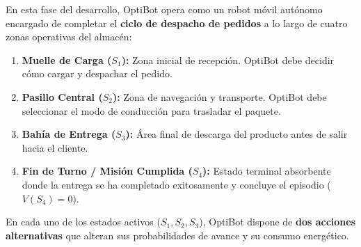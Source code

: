\begin{optibot}
En esta fase del desarrollo, OptiBot opera como un robot móvil autónomo encargado de completar el \textbf{ciclo de despacho de pedidos} a lo largo de cuatro zonas operativas del almacén:
\begin{enumerate}
  \item \textbf{Muelle de Carga ($S_1$):} Zona inicial de recepción. OptiBot debe decidir cómo cargar y despachar el pedido.
  \item \textbf{Pasillo Central ($S_2$):} Zona de navegación y transporte. OptiBot debe seleccionar el modo de conducción para trasladar el paquete.
  \item \textbf{Bahía de Entrega ($S_3$):} Área final de descarga del producto antes de salir hacia el cliente.
  \item \textbf{Fin de Turno / Misión Cumplida ($S_4$):} Estado terminal absorbente donde la entrega se ha completado exitosamente y concluye el episodio ($V(S_4) = 0$).
\end{enumerate}
En cada uno de los estados activos ($S_1, S_2, S_3$), OptiBot dispone de \textbf{dos acciones alternativas} que alteran sus probabilidades de avance y su consumo energético.
\end{optibot}

